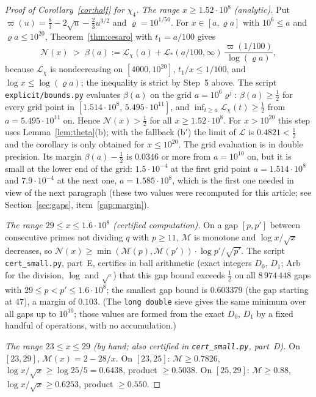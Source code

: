 \documentclass[11pt]{amsart}
\theoremstyle{definition}
\numberwithin{equation}{section}
\newcommand{\cM}{\mathcal M}          %
\newcommand{\cN}{\mathcal N}          %
\newcommand{\cL}{\mathcal L}          %
\begin{document}
\begin{proof}[Proof of Corollary~\ref{cor:half} for $\chi_4$]
\emph{The range $x\ge1.52\cdot10^8$ (analytic).} Put
$\varpi(u)=\tfrac83-2\sqrt u-\tfrac23u^{3/2}$ and
$\varrho=10^{1/50}$. For $x\in[a,\varrho a]$ with $10^6\le a$ and
$\varrho a\le10^{20}$, Theorem~\ref{thm:cesaro} with $t_1=a/100$
gives
\[
\cN(x)\;>\;\beta(a):=\cL_\chi(a)
+\cL_*(a/100,\infty)\,\frac{\varpi(1/100)}{\log(\varrho a)},
\]
because $\cL_\chi$ is nondecreasing on $[4000,10^{20}]$,
$t_1/x\le1/100$, and $\log x\le\log(\varrho a)$; the inequality is
strict by Step~5 above. The script \texttt{explicit/bounds.py}
evaluates $\beta(a)$ on the grid $a=10^6\varrho^j$:
$\beta(a)\ge\tfrac12$ for every grid point in
$[1.514\cdot10^8,\,5.495\cdot10^{11}]$, and
$\inf_{t\ge a}\cL_\chi(t)\ge\tfrac12$ from $a=5.495\cdot10^{11}$ on.
Hence $\cN(x)>\tfrac12$ for all $x\ge1.52\cdot10^8$. For
$x>10^{20}$ this step uses Lemma~\ref{lem:theta}(b); with the
fallback (b$'$) the limit of $\cL$ is $0.4821<\tfrac12$ and the
corollary is only obtained for $x\le10^{20}$. The grid evaluation is
in double precision. Its margin $\beta(a)-\tfrac12$ is $0.0346$ or
more from $a=10^{10}$ on, but it is small at the lower end of the
grid: $1.5\cdot10^{-4}$ at the first grid point
$a=1.514\cdot10^8$ and $7.9\cdot10^{-4}$ at the next one,
$a=1.585\cdot10^8$, which is the first one needed in view of the next
paragraph (these two values were recomputed for this article; see
Section~\ref{sec:gaps}, item~\ref{gap:margin}).

\emph{The range $29\le x\le1.6\cdot10^8$ (certified computation).} On
a gap $[p,p']$ between consecutive primes not dividing $q$ with
$p\ge11$, $\cM$ is monotone and $\log x/\sqrt x$ decreases, so
$\cN(x)\ge\min(\cM(p),\cM(p'))\cdot\log p'/\sqrt{p'}$. The script
\texttt{cert\_small.py}, part~E, certifies in ball arithmetic (exact
integers $D_0$, $D_1$; Arb for the division, $\log$ and
$\sqrt{\cdot}$) that this gap bound exceeds $\tfrac12$ on all
$8\,974\,448$ gaps with $29\le p<p'\le1.6\cdot10^8$; the smallest gap
bound is $0.603379$ (the gap starting at $47$), a margin of $0.103$.
(The \texttt{long double} sieve gives the same minimum over all gaps
up to $10^{10}$; those values are formed from the exact $D_0$, $D_1$
by a fixed handful of operations, with no accumulation.)

\emph{The range $23\le x\le29$ (by hand; also certified in
\texttt{cert\_small.py}, part~D).} On $[23,29]$,
$\cM(x)=2-28/x$. On $[23,25]$: $\cM\ge0.7826$,
$\log x/\sqrt x\ge\log25/5=0.6438$, product $\ge0.5038$. On
$[25,29]$: $\cM\ge0.88$, $\log x/\sqrt x\ge0.6253$, product
$\ge0.550$.
\end{proof}
\end{document}
